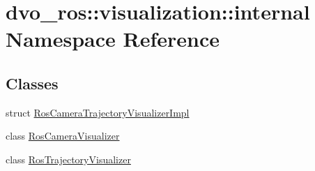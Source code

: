 \hypertarget{namespacedvo__ros_1_1visualization_1_1internal}{}\section{dvo\+\_\+ros\+:\+:visualization\+:\+:internal Namespace Reference}
\label{namespacedvo__ros_1_1visualization_1_1internal}
\subsection*{Classes}
\begin{DoxyCompactItemize}
\item 
struct \mbox{\hyperlink{structdvo__ros_1_1visualization_1_1internal_1_1_ros_camera_trajectory_visualizer_impl}{Ros\+Camera\+Trajectory\+Visualizer\+Impl}}
\item 
class \mbox{\hyperlink{classdvo__ros_1_1visualization_1_1internal_1_1_ros_camera_visualizer}{Ros\+Camera\+Visualizer}}
\item 
class \mbox{\hyperlink{classdvo__ros_1_1visualization_1_1internal_1_1_ros_trajectory_visualizer}{Ros\+Trajectory\+Visualizer}}
\end{DoxyCompactItemize}
